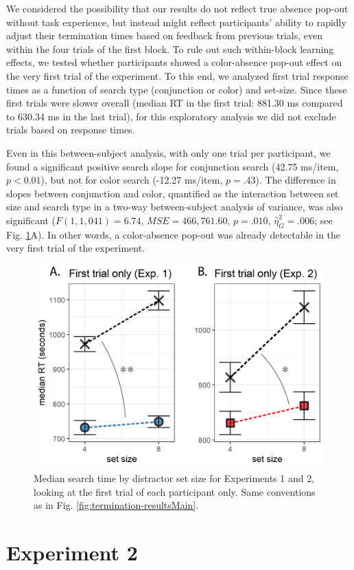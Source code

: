 \documentclass[12pt,twoside]{reedthesis}
\begin{document}
We considered the possibility that our results do not reflect true absence pop-out without task experience, but instead might reflect participants' ability to rapidly adjust their termination times based on feedback from previous trials, even within the four trials of the first block. To rule out such within-block learning effects, we tested whether participants showed a color-absence pop-out effect on the very first trial of the experiment. To this end, we analyzed first trial response times as a function of search type (conjunction or color) and set-size. Since these first trials were slower overall (median RT in the first trial: 881.30 ms compared to 630.34 ms in the last trial), for this exploratory analysis we did not exclude trials based on response times.

Even in this between-subject analysis, with only one trial per participant, we found a significant positive search slope for conjunction search (42.75 ms/item, \(p<0.01\)), but not for color search (-12.27 ms/item, \(p=.43\)). The difference in slopes between conjunction and color, quantified as the interaction between set size and search type in a two-way between-subject analysis of variance, was also significant (\(F(1, 1,041) = 6.74\), \(\mathit{MSE} = 466,761.60\), \(p = .010\), \(\hat{\eta}^2_G = .006\); see Fig. \ref{fig:termination-firstTrial}A). In other words, a color-absence pop-out was already detectable in the very first trial of the experiment.


\begin{figure}
\includegraphics[width=1\linewidth]{figure/termination/results_first_trials_with_stars} \caption[First-trial analysis]{Median search time by distractor set size for Experiments 1 and 2, looking at the first trial of each participant only. Same conventions as in Fig. \ref{fig:termination-resultsMain}.}\label{fig:termination-firstTrial}
\end{figure}
\hypertarget{experiment-2}{%
\section{Experiment 2}\label{experiment-2}}
\end{document}
